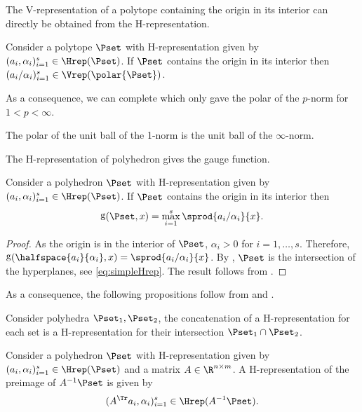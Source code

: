 \documentclass[11pt,twoside,a4paper,openright]{uclouvain-thesis}
\DeclareMathOperator{\gauge}{g}
\newcommand{\ineqnum}{s}
\begin{document}
The V-representation of a polytope containing the origin in its interior can directly be
obtained from the H-representation.
\begin{myprop} %
  Consider a polytope $\Pset$ with H-representation given by
  $(a_i, \alpha_i)_{i=1}^{\ineqnum} \in \Hrep(\Pset)$.
  If $\Pset$ contains the origin in its interior then
  $(a_i / \alpha_i)_{i=1}^{\ineqnum} \in \Vrep(\polar{\Pset})$.
\end{myprop}

As a consequence, we can complete  which only gave the polar of
the $p$-norm for $1 < p < \infty$.
\begin{mycoro}
  \label{coro:polar1norm}
  The polar of the unit ball of the 1-norm is the unit ball of the $\infty$-norm.
\end{mycoro}

The H-representation of polyhedron gives the gauge function.


\begin{myprop}
  \label{prop:gaugepolyhedron}
  Consider a polyhedron $\Pset$ with H-representation given by
  $(a_i, \alpha_i)_{i=1}^{\ineqnum} \in \Hrep(\Pset)$.
  If $\Pset$ contains the origin in its interior then
  \begin{equation*}
    \gauge(\Pset, x) = \max_{i=1}^\ineqnum \sprod{a_i / \alpha_i}{x}.
  \end{equation*}
  \begin{proof}
    As the origin is in the interior of $\Pset$,
    $\alpha_i > 0$ for $i = 1, \ldots, \ineqnum$.
    Therefore, $\gauge(\halfspace{a_i}{\alpha_i}, x) = \sprod{a_i / \alpha_i}{x}$.
    By , $\Pset$ is the intersection of the hyperplanes, see \eqref{eq:simpleHrep}.
    The result follows from .
  \end{proof}
\end{myprop}

As a consequence, the following propositions follow from  and .
\begin{myprop}
  Consider polyhedra $\Pset_1, \Pset_2$, the concatenation
  of a H-representation for each set
  is a H-representation for their intersection
  $\Pset_1 \cap \Pset_2$.
\end{myprop}
\begin{myprop}
  \label{prop:gApolyhedron}
  Consider a polyhedron $\Pset$ with H-representation given by
  $(a_i, \alpha_i)_{i=1}^{\ineqnum} \in \Hrep(\Pset)$ and
  a matrix $A \in \R^{n \times m}$.
  A H-representation of the preimage of $A^{-1}\Pset$ is given by
  \begin{equation*}
    (A^\Tr a_i, \alpha_i)_{i=1}^{\ineqnum} \in \Hrep(A^{-1}\Pset).
  \end{equation*}
\end{myprop}
\end{document}

